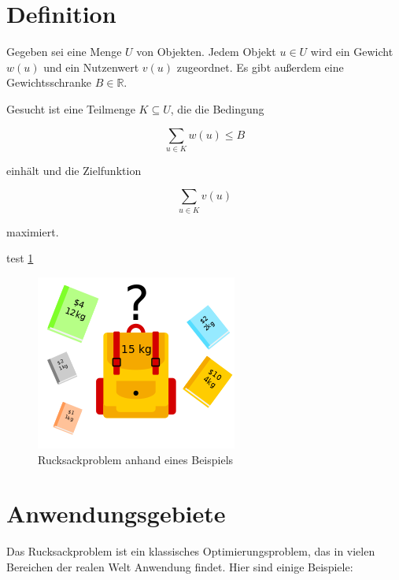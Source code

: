 \documentclass[12pt]{report}
\begin{document}
\section{Definition}
Gegeben sei eine Menge $U$ von Objekten. Jedem Objekt $u \in U$ wird ein Gewicht $w(u)$ und ein Nutzenwert $v(u)$ zugeordnet. Es gibt außerdem eine Gewichtsschranke $B \in \mathbb{R}$.

Gesucht ist eine Teilmenge $K \subseteq U$, die die Bedingung

$$\sum_{u \in K} w(u) \leq B$$

einhält und die Zielfunktion

$$\sum_{u \in K} v(u)$$

maximiert. \cite{kellerer2004knapsack}

test \ref{fig:rucksackproblem}

\begin{figure}[h]
	\centering
	\includegraphics[width=0.5 \linewidth]{Knapsack_Problem_Illustration}
	\caption{Rucksackproblem anhand eines Beispiels}
	\label{fig:rucksackproblem}
\end{figure}

\section{Anwendungsgebiete}
Das Rucksackproblem ist ein klassisches Optimierungsproblem, das in vielen Bereichen der realen Welt Anwendung findet. Hier sind einige Beispiele:
\end{document}
